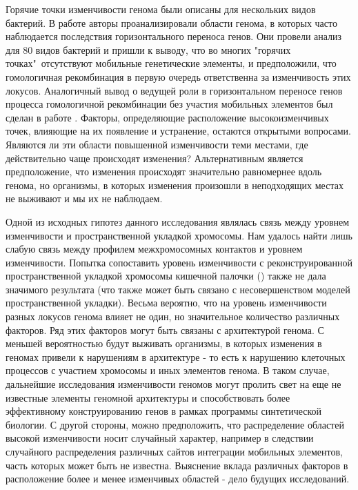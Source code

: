 Горячие точки изменчивости генома были описаны для нескольких видов бактерий. В работе \cite{oliveira2017chromosomal} авторы проанализировали области генома, в которых часто наблюдается последствия горизонтального переноса генов. Они провели анализ для 80 видов бактерий и пришли к выводу, что во многих "горячих точках"\ отсутствуют мобильные генетические элементы, и предположили, что гомологичная рекомбинация в первую очередь ответственна за изменчивость этих локусов. Аналогичный вывод о ведущей роли в горизонтальном переносе генов процесса гомологичной рекомбинации без участия мобильных элементов был сделан в работе \cite{ely2020recombination}. Факторы, определяющие расположение высокоизменчивых точек, влияющие на их появление и устранение, остаются открытыми вопросами. Являются ли эти области повышенной изменчивости теми местами, где действительно чаще происходят изменения? Альтернативным является предположение, что изменения происходят значительно равномернее вдоль генома, но организмы, в которых изменения произошли в неподходящих местах не выживают и мы их не наблюдаем.

Одной из исходных гипотез данного исследования являлась связь между уровнем изменчивости и пространственной укладкой хромосомы. Нам удалось найти лишь слабую связь между профилем межхромосомных контактов и уровнем изменчивости. Попытка сопоставить уровень изменчивости с реконструированной пространственной укладкой хромосомы кишечной палочки (\cite{hacker2017features}) также не дала значимого результата (что также может быть связано с несовершенством моделей пространственной укладки). Весьма вероятно, что на уровень изменчивости разных локусов генома влияет не один, но значительное количество различных факторов. Ряд этих факторов могут быть связаны с архитектурой генома. С меньшей вероятностью будут выживать организмы, в которых изменения в геномах привели к нарушениям в архитектуре - то есть к нарушению клеточных процессов с участием хромосомы и иных элементов генома. В таком случае, дальнейшие исследования изменчивости геномов могут пролить свет на еще не известные элементы геномной архитектуры и способствовать более эффективному конструированию генов в рамках программы синтетической биологии. С другой стороны, можно предположить, что распределение областей высокой изменчивости носит случайный характер, например в следствии случайного распределения различных сайтов интеграции мобильных элементов, часть которых может быть не известна. Выяснение вклада различных факторов в расположение более и менее изменчивых областей - дело будущих исследований. 

